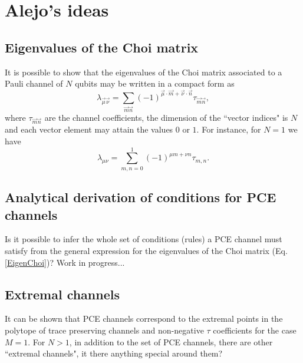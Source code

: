\section{Alejo's ideas}
% 
\subsection{Eigenvalues of the Choi matrix}
% 
It is possible to show that the eigenvalues of the Choi matrix associated to a Pauli channel of $N$ qubits may be written in a compact form as
% 
\begin{equation}
 \lambda_{\vec{\mu}\vec{\nu}}=\sum_{\vec{m}\vec{n}}(-1)^{\vec{\mu}\cdot\vec{m} + \vec{\nu}\cdot\vec{n}} \tau_{\vec{m}\vec{n}},
 \label{EigenChoi}
\end{equation}
% 
where $\tau_{\vec{m}\vec{n}}$ are the channel coefficients, the dimension of the ``vector indices" is $N$ and each vector element may attain the values $0$ or $1$. For instance, for $N=1$ we have
% 
\begin{equation}
 \lambda_{\mu\nu}=\sum_{m,n=0}^1(-1)^{\mu m + \nu n} \tau_{m,n}.
\end{equation}
% 
% 
\subsection{Analytical derivation of conditions for PCE channels}
% 
Is it possible to infer the whole set of conditions (rules) a PCE channel must satisfy from the general expression for the eigenvalues of the Choi matrix (Eq. \ref{EigenChoi})? Work in progress...

% 
\subsection{Extremal channels}
% 
It can be shown that PCE channels correspond to the extremal points in the polytope of trace preserving channels and non-negative $\tau$ coefficients for the case $M=1$. For $N>1$, in addition to the set of PCE channels, there are other  ``extremal channels", it there anything special around them?


